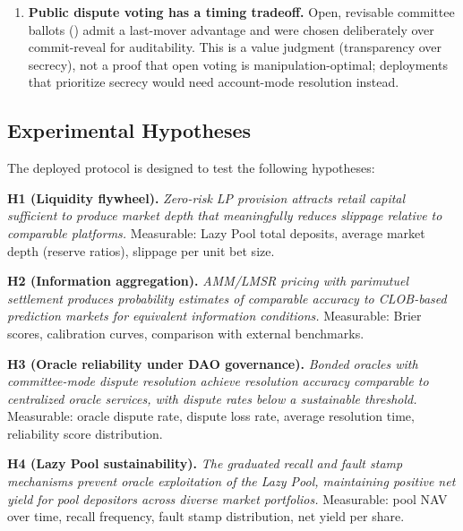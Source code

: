\documentclass{ledger}
\theoremstyle{plain}
\theoremstyle{remark}
\begin{document}
\begin{enumerate}
  secondary liquidity, too high a cap erodes the reward to holders --- and in the
  high-fee corner the settlement clamp further shrinks the effective bucket to
  preserve solvency, deepening the early-exit haircut. Finding the value that
  maximizes secondary liquidity without discouraging holding is an empirical
  question (, H8), not one the theory settles.
  \item \textbf{Public dispute voting has a timing tradeoff.} Open, revisable
  committee ballots () admit a last-mover advantage and
  were chosen deliberately over commit-reveal for auditability. This is a value
  judgment (transparency over secrecy), not a proof that open voting is
  manipulation-optimal; deployments that prioritize secrecy would need
  account-mode resolution instead.
\end{enumerate}

\subsection{Experimental Hypotheses}\label{sec:hypotheses}

The deployed protocol is designed to test the following hypotheses:

\textbf{H1 (Liquidity flywheel).} \emph{Zero-risk LP provision attracts retail
capital sufficient to produce market depth that meaningfully reduces slippage
relative to comparable platforms.} Measurable: Lazy Pool total deposits, average
market depth (reserve ratios), slippage per unit bet size.

\textbf{H2 (Information aggregation).} \emph{AMM/LMSR pricing with parimutuel
settlement produces probability estimates of comparable accuracy to CLOB-based
prediction markets for equivalent information conditions.} Measurable: Brier
scores, calibration curves, comparison with external benchmarks.

\textbf{H3 (Oracle reliability under DAO governance).} \emph{Bonded oracles with
committee-mode dispute resolution achieve resolution accuracy comparable to
centralized oracle services, with dispute rates below a sustainable threshold.}
Measurable: oracle dispute rate, dispute loss rate, average resolution time,
reliability score distribution.

\textbf{H4 (Lazy Pool sustainability).} \emph{The graduated recall and fault
stamp mechanisms prevent oracle exploitation of the Lazy Pool, maintaining
positive net yield for pool depositors across diverse market portfolios.}
Measurable: pool NAV over time, recall frequency, fault stamp distribution, net
yield per share.
\end{document}

